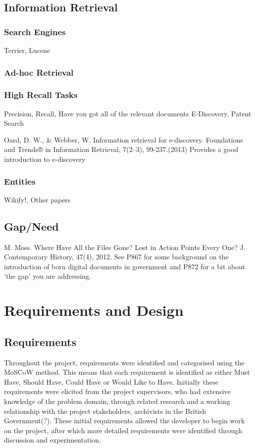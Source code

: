 \documentclass{l4proj}
\begin{document}
\section{Information Retrieval}
\subsection{Search Engines}
Terrier, Lucene
\subsection{Ad-hoc Retrieval}

\subsection{High Recall Tasks}
Precision, Recall, Have you got all of the relevant documents
E-Discovery, Patent Search

Oard, D. W., \& Webber, W. Information retrieval for e-discovery. Foundations and Trends® in Information Retrieval, 7(2–3), 99-237.(2013)
Provides a good introduction to e-discovery
\subsection{Entities}
Wikify!, Other papers

\section{Gap/Need}
M. Moss. Where Have All the Files Gone? Lost in Action Points Every One? J. Contemporary History, 47(4), 2012.
See P867 for some background on the introduction of born digital documents in government and P872 for a bit about 'the gap’ you are addressing.

\chapter{Requirements and Design}
\section{Requirements}
Throughout the project, requirements were identified and categorised using the MoSCoW method. This means that each requirement is identified as either Must Have, Should Have, Could Have or Would Like to Have.
Initially these requirements were elicited from the project supervisors, who had extensive knowledge of the problem domain, through related research and a working relationship with the project stakeholders, archivists in the British Government(?).
These initial requirements allowed the developer to begin work on the project, after which more detailed requirements were identified through discussion and experimentation.
\end{document}

